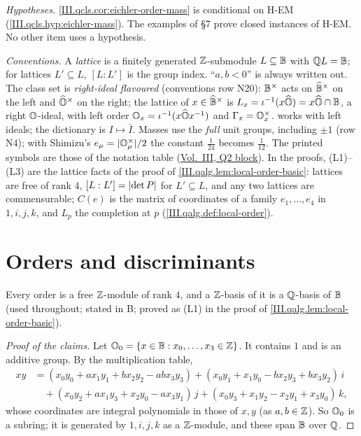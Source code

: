 \noindent\emph{Hypotheses.} \cref{III.qcls.cor:eichler-order-mass} is conditional on H-EM (\cref{III.qcls.hyp:eichler-mass}). The examples of §7
prove closed instances of H-EM. No other item uses a hypothesis.

\noindent\emph{Conventions.} A \emph{lattice} is a finitely generated $\mathbb{Z}$-submodule $L\subseteq\mathbb{B}$ with $\mathbb{Q} L=\mathbb{B}$; for lattices $L'\subseteq L$,
$[L:L']$ is the group index. ``$a,b<0$'' is always written out. The class set is \emph{right-ideal flavoured} (conventions row N20): $\mathbb{B}^\times$
acts on $\widehat{\mathbb{B}}^\times$ on the left and $\widehat{\mathbb{O}}^\times$ on the right; the lattice of $x\in\widehat{\mathbb{B}}^\times$ is $L_x=\iota^{-1}(x\widehat{\mathbb{O}})=x\widehat{\mathbb{O}}\cap\mathbb{B}$, a
right $\mathbb{O}$-ideal, with left order $\mathbb{O}_x=\iota^{-1}(x\widehat{\mathbb{O}} x^{-1})$ and $\Gamma_x=\mathbb{O}_x^\times$. \cite{Piz} works with left ideals; the
dictionary is $I\mapsto\bar I$. Masses use the \emph{full} unit groups, including $\pm1$ (row N4); with Shimizu's $e_\mu=\lvert\mathbb{O}_\mu^\times\rvert/2$
the constant $\frac1{24}$ becomes $\frac1{12}$. The printed symbols are those of the notation table (\hyperref[notation:q2]{Vol.~III, Q2 block}).
In the proofs, (L1)--(L3) are the lattice facts of the proof of \cref{III.qalg.lem:local-order-basic}: lattices are free of rank $4$,
$[L:L']=\lvert\det P\rvert$ for $L'\subseteq L$, and any two lattices are commensurable; $C(e)$ is the matrix of coordinates of a family $e_1,\dots,e_4$
in $1,i,j,k$, and $L_p$ the completion at $p$ (\cref{III.qalg.def:local-order}).

\section{Orders and discriminants}\label{sec:qord-orders}

\begin{definition}[orders]
\end{definition}
\noindent Every order is a free $\mathbb{Z}$-module of rank $4$, and a $\mathbb{Z}$-basis of it is a $\mathbb{Q}$-basis of $\mathbb{B}$ (used throughout; stated in B; proved as
(L1) in the proof of \cref{III.qalg.lem:local-order-basic}).

\begin{definition}
\end{definition}
\begin{proof}[Proof of the claims]
Let $\mathbb{O}_0=\{x\in\mathbb{B}:x_0,\dots,x_3\in\mathbb{Z}\}$. It contains $1$ and is an additive group. By the multiplication table,
\begin{align*}
  xy&=(x_0y_0+ax_1y_1+bx_2y_2-abx_3y_3)+(x_0y_1+x_1y_0-bx_2y_3+bx_3y_2)\,i\\
  &\quad+(x_0y_2+ax_1y_3+x_2y_0-ax_3y_1)\,j+(x_0y_3+x_1y_2-x_2y_1+x_3y_0)\,k,
\end{align*}
whose coordinates are integral polynomials in those of $x,y$ (as $a,b\in\mathbb{Z}$). So $\mathbb{O}_0$ is a subring; it is generated by $1,i,j,k$ as a $\mathbb{Z}$-module,
and these span $\mathbb{B}$ over $\mathbb{Q}$.
\end{proof}

